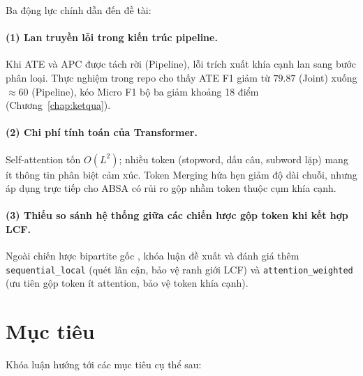 Ba động lực chính dẫn đến đề tài:

\paragraph{(1) Lan truyền lỗi trong kiến trúc pipeline.}
Khi ATE và APC được tách rời (Pipeline), lỗi trích xuất khía cạnh lan sang bước phân loại.
Thực nghiệm trong repo cho thấy ATE F1 giảm từ $79.87$ (Joint) xuống $\approx 60$
(Pipeline), kéo Micro F1 bộ ba giảm khoảng 18 điểm (Chương~\ref{chap:ketqua}).

\paragraph{(2) Chi phí tính toán của Transformer.}
Self-attention tốn $O(L^2)$; nhiều token (stopword, dấu câu, subword lặp) mang ít thông
tin phân biệt cảm xúc. Token Merging hứa hẹn giảm độ dài chuỗi, nhưng áp dụng trực tiếp
cho ABSA có rủi ro gộp nhầm token thuộc cụm khía cạnh.

\paragraph{(3) Thiếu so sánh hệ thống giữa các chiến lược gộp token khi kết hợp LCF.}
Ngoài chiến lược bipartite gốc \cite{bolya2023tome}, khóa luận đề xuất và đánh giá thêm
\texttt{sequential\_local} (quét lân cận, bảo vệ ranh giới LCF) và
\texttt{attention\_weighted} (ưu tiên gộp token ít attention, bảo vệ token khía cạnh).

\section{Mục tiêu}
\label{sec:gt_muctieu}

Khóa luận hướng tới các mục tiêu cụ thể sau:

